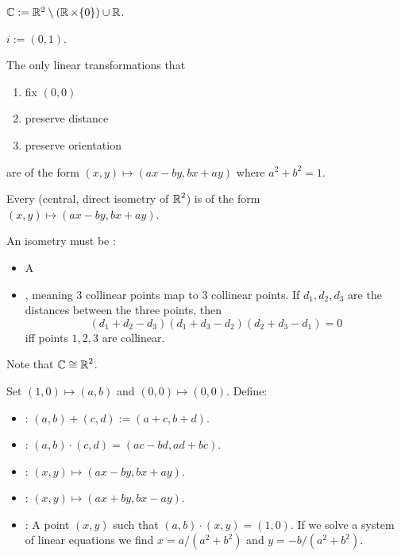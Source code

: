 \documentclass[notes]{subfiles}
\begin{document}
\begin{definition}
$\operatorname{\mathbb{C}} := \mathbb{R}^2 \setminus (\operatorname{\mathbb{R}} \times \{0\}) \cup \operatorname{\mathbb{R}}$.
\end{definition}

\begin{definition}
    $i := (0,1)$.
\end{definition}

\begin{theorem}
    The only linear transformations that
    \begin{enumerate}
        \item fix $(0,0)$
        \item preserve distance
        \item preserve orientation
    \end{enumerate}
    are of the form $(x,y) \mapsto (ax - by, bx + ay)$ where $a^2 + b^2 = 1$.
\end{theorem}

\noindent
Every  (central, direct isometry of $\operatorname{\mathbb{R}}^2$)
is of the form $(x,y) \mapsto (ax-by, bx+ay)$.

An isometry must be :
\begin{itemize}
    \item A  
    \item {}, meaning $3$ collinear points map to $3$ collinear points.
    If $d_1, d_2, d_3$ are the distances between the three points, then
    \[ (d_1 + d_2 - d_3)(d_1 + d_3 - d_2)(d_2 + d_3 - d_1) = 0 \]
    iff points $1,2,3$ are collinear.
\end{itemize}

\noindent
Note that $\operatorname{\mathbb{C}} \cong \operatorname{\mathbb{R}}^2$.

Set $(1,0) \mapsto (a,b)$ and $(0,0) \mapsto (0,0)$.
Define:
\begin{itemize}
    \item {}: $(a,b) + (c,d) := (a+c, b+d)$.
    \item {}: $(a,b) \cdot (c,d) = (ac - bd, ad + bc)$.
    \item {}: $(x,y) \mapsto (ax - by, bx + ay)$.
    \item {}: $(x,y) \mapsto (ax + by, bx - ay)$.
    \item {}: A point $(x,y)$ such that $(a,b) \cdot (x,y) = (1,0)$.
    If we solve a system of linear equations we find $x = a/(a^2 + b^2)$ and $y = -b/(a^2+b^2)$.
\end{itemize}
\end{document}
